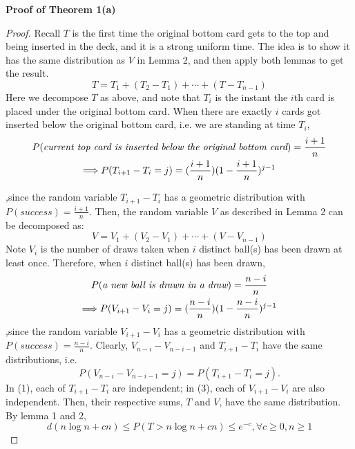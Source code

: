 \documentclass[12pt]{article}
\theoremstyle{plain}
\theoremstyle{definition}
\theoremstyle{remark}
\begin{document}
\textbf{Proof of Theorem 1(a)}\cite{1.1}
\begin{proof}
Recall $T$ is the first time the original bottom card gets to the top and being inserted in the deck, and it is a strong uniform time. The idea is to show it has the same distribution as $V$ in Lemma 2, and then apply both lemmas to get the result.
\begin{equation}
    T=T_1+(T_2-T_1)+\cdots+(T-T_{n-1})
\end{equation}
Here we decompose $T$ as above, and note that $T_i$ is the instant the $i$th card is placed under the original bottom card. When there are exactly $i$ cards got inserted below the original bottom card, i.e. we are standing at time $T_i$, 
\begin{gather}
P(\text{\it{current top card is inserted below the original bottom card}})=\frac{i+1}{n}\nonumber\\
\Longrightarrow P(T_{i+1}-T_i=j)=(\frac{i+1}{n})(1-\frac{i+1}{n})^{j-1}
\end{gather}


,since the random variable $T_{i+1}-T_i$ has a geometric distribution with $P(success)=\frac{i+1}{n}$. Then, the random variable $V$ as described in Lemma 2 can be decomposed as:
\begin{equation}
    V=V_1+(V_2-V_1)+\cdots+(V-V_{n-1})
\end{equation}
Note $V_i$ is the number of draws taken when $i$ distinct ball(s) has been drawn at least once. Therefore, when $i$ distinct ball(s) has been drawn,
\begin{gather}
P(\text{\it{a new ball is drawn in a draw}})=\frac{n-i}{n}\nonumber\\
\Longrightarrow P(V_{i+1}-V_i=j)=(\frac{n-i}{n})(1-\frac{n-i}{n})^{j-1}
\end{gather}
,since the random variable $V_{i+1}-V_i$ has a geometric distribution with $P(success)=\frac{n-i}{n}$. Clearly, $V_{n-i}-V_{n-i-1}$ and $T_{i+1}-T_i$ have the same distributions, i.e.
$$P(V_{n-i}-V_{n-i-1}=j)=P(T_{i+1}-T_i=j).$$
In (1), each of $T_{i+1}-T_i$ are independent; in (3), each of $V_{i+1}-V_i$ are also independent. Then, their respective sums, $T$ and $V$, have the same distribution. By lemma 1 and 2, $$ d(n\log n+cn)\leq  P(T>n\log n+cn)\leq e^{-c},\forall c\geq0,n\geq1$$
\end{proof}
\end{document}
